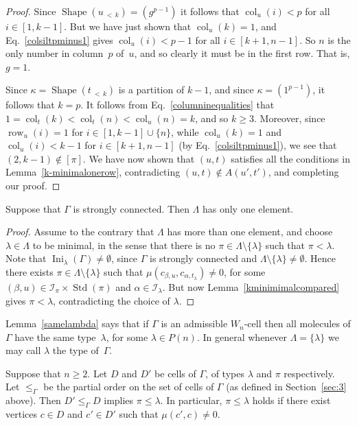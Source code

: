 \documentclass[ALCO,ThmDefs,Unicode,epreuves]{cedram}
\DeclareMathOperator{\Ini}{Ini}
\DeclareMathOperator{\row}{row}
\DeclareMathOperator{\col}{col}
\newcommand{\lessthan}[2]{#1\,{_{<\,#2}}}
\DeclareMathOperator{\STD}{Std}
\DeclareMathOperator{\shape}{Shape}
\begin{document}
\begin{proof}
Since $\shape(\lessthan uk)=(g^{p-1})$ it follows that $\col_u(i)<p$ for
all $i\in[1,k-1]$. But we have just shown that $\col_u(k)=1$, and
Eq.~\eqref{colsiltpminus1} gives $\col_u(i)<p-1$ for all $i\in[k+1,n-1]$.
So $n$ is the only number in column~$p$ of~$u$, and so clearly it
must be in the first row. That is, $g=1$.

Since $\kappa=\shape(\lessthan tk)$ is a partition of $k-1$, and since $\kappa=(1^{p-1})$,
it follows that $k=p$. It follows from Eq.~\eqref{columninequalities} that
$1=\col_t(k)<\col_t(n)<\col_u(n)=k$, and so $k\geqslant 3$. Moreover,
since $\row_u(i)=1$ for $i\in[1,k-1]\cup\{n\}$, while $\col_u(k)=1$
and $\col_u(i)<k-1$ for $i\in[k+1,n-1]$ (by Eq.~\eqref{colsiltpminus1}),
we see that $(2,k-1)\notin [\pi]$. We have now shown that $(u,t)$
satisfies all the conditions in Lemma~\ref{k-minimalonerow}, contradicting
$(u,t)\notin A(u',t')$, and completing our proof.
\end{proof}

\begin{lemm}\label{samelambda}
Suppose that $\Gamma$ is strongly connected. Then $\Lambda$ has only one element.
\end{lemm}

\begin{proof}
Assume to the contrary that $\Lambda$ has more than one element, and
choose $\lambda\in\Lambda$ to be minimal, in the sense that there is no
$\pi\in\Lambda\setminus\{\lambda\}$ such that $\pi<\lambda$. Note that
$\Ini_{\lambda}(\Gamma)\neq\emptyset$, since
$\Gamma$ is strongly connected and $\Lambda\setminus\{\lambda\}\ne\emptyset$.
Hence there exists $\pi\in\Lambda\setminus\{\lambda\}$ such that
$\mu(c_{\beta,u},c_{\alpha,t_{\lambda}})\neq 0$,
for some $(\beta,u)\in\mathcal{I}_{\pi}\times\STD(\pi)$ and
$\alpha\in\mathcal{I}_{\lambda}$. But now Lemma~\ref{kminimimalcompared}
gives $\pi<\lambda$, contradicting the choice of $\lambda$.
\end{proof}
Lemma~\ref{samelambda} says that if $\Gamma$ is an admissible $W_n$-cell
then all molecules of $\Gamma$ have the same type~$\lambda$, for some
$\lambda\in P(n)$. In general whenever $\Lambda=\{\lambda\}$ we may
call $\lambda$ the type of~$\Gamma$.

\begin{lemm}\label{muandnucells}
Suppose that $n\geqslant 2$. Let $D$ and $D'$ be cells of $\Gamma$,
of types $\lambda$ and $\pi$ respectively. Let $\leqslant_\Gamma$
be the partial order on the set of cells of $\Gamma$ (as defined in
Section~\ref{sec:3} above).
Then $D'\leqslant_{\Gamma} D$ implies $\pi\leqslant\lambda$. In particular,
$\pi\leqslant\lambda$ holds if there exist vertices $c\in D$ and $c'\in D'$
such that $\mu(c',c) \neq 0$.
\end{lemm}
\end{document}
